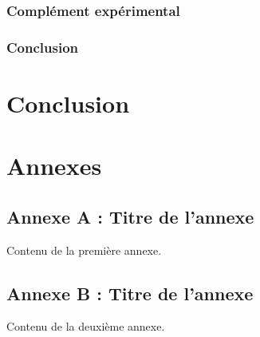 \documentclass[11pt]{report}
\theoremstyle{definition}
\theoremstyle{remark}
\begin{document}
        \subsection{Complément expérimental}            
        \subsection{Conclusion}                         

\chapter{Conclusion}

\newpage

\printbibliography
{}

\newpage

\appendix
\chapter*{Annexes}
\section{Annexe A : Titre de l'annexe}
Contenu de la première annexe.

\section{Annexe B : Titre de l'annexe}
Contenu de la deuxième annexe.

\end{document}
